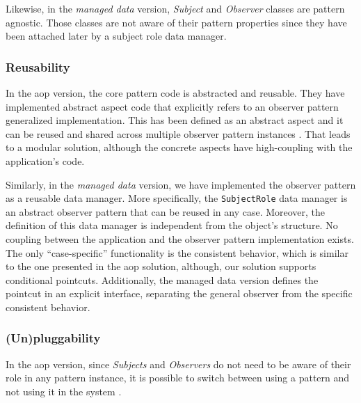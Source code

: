Likewise, in the \textit{managed data} version, \textit{Subject} and \textit{Observer} classes are pattern agnostic.
Those classes are not aware of their pattern properties since they have been attached later by a subject role data manager.

\subsubsection{Reusability}

In the \ac{aop} version, the core pattern code is abstracted and reusable. 
They have implemented abstract aspect code that explicitly refers to an observer pattern generalized implementation.
This has been defined as an abstract aspect and it can be reused and shared across multiple observer pattern instances \cite{hannemann2005role}.
That leads to a modular solution, although the concrete aspects have high-coupling with the application's code.

Similarly, in the \textit{managed data} version, we have implemented the observer pattern as a reusable data manager.
More specifically, the \texttt{SubjectRole} data manager is an abstract observer pattern that can be reused in any case.
Moreover, the definition of this data manager is independent from the object's structure.
No coupling between the application and the observer pattern implementation exists.
The only ``case-specific'' functionality is the consistent behavior, which is similar to the one presented in the \ac{aop} solution, although, our solution supports conditional pointcuts.
Additionally, the managed data version defines the pointcut in an explicit interface, separating the general observer from the specific consistent behavior.

\subsubsection{(Un)pluggability}

In the \ac{aop} version, since \textit{Subjects} and \textit{Observers} do not need to be aware of their role in any pattern instance, it is possible to switch between using a pattern and not using it in the system \cite{hannemann2005role}. 


